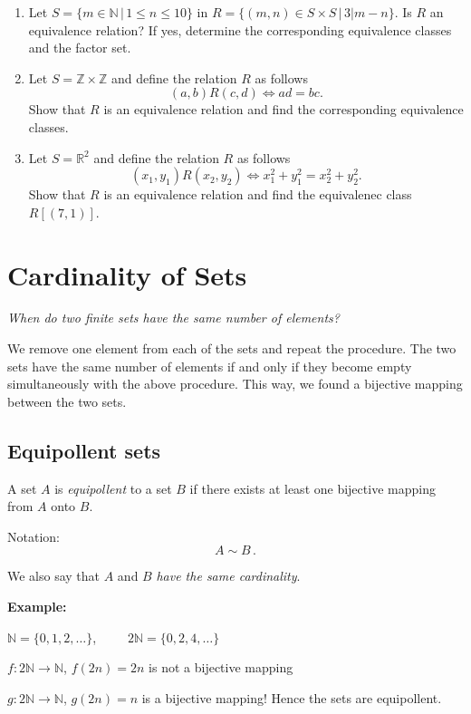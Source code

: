 \documentclass[11pt,paper=b5,footinclude,headinclude]{scrbook} %
\theoremstyle{remark}
\theoremstyle{definition} %
\theoremstyle{theorem} %
\begin{document}
\begin{enumerate}
\item Let $S= \{m\in \mathbb{N}\,|\, 1\leq n \leq 10\}$ in $R=\{(m,n)\in S\times S\,|\, 3|m-n\}$.
Is $R$ an equivalence relation? If yes, determine the corresponding equivalence classes and the factor set.

\item Let $S = \mathbb{Z}\times \mathbb{Z}$ and define the relation $R$ as follows
$$(a,b)R(c,d)\Leftrightarrow ad = bc.$$
Show that $R$ is an equivalence relation  and find the corresponding equivalence classes.

\item Let  $S =  \mathbb{R}^2$ and define the relation $R$ as follows
$$(x_1,y_1)R(x_2,y_2)\Leftrightarrow x_1^2 + y_1^2 = x_2^2 + y_2^2.$$
Show that $R$ is an equivalence relation  and find the equivalenec class $R[(7,1)]$.



\end{enumerate}


\chapter{Cardinality of Sets}
{\em When do two finite sets have the same number of elements?

We remove one element from each of the sets and repeat the procedure.
The two sets have the same number of elements if and only if they become empty simultaneously with the above procedure.
This way, we found a bijective mapping between the two sets.}

\section{Equipollent sets}

A set $A$ is {\em equipollent} to a set $B$ if there exists at least one bijective mapping from $A$ onto $B$.

Notation: $$A\sim B\,.$$

We also say that $A$ and $B$ \emph{ have the same cardinality}.



\textbf{ Example:}

$\mathbb{N} = \{0,1,2,\ldots\}$,~~~~~$2\mathbb{N} = \{0,2,4,\ldots\}$

$f: 2\mathbb{N} \to \mathbb{N}$, $f(2n) = 2n$ is not a bijective mapping

$g: 2\mathbb{N} \to \mathbb{N}$, $g(2n) = n$ is a bijective mapping!
Hence the sets are equipollent.
\end{document}
